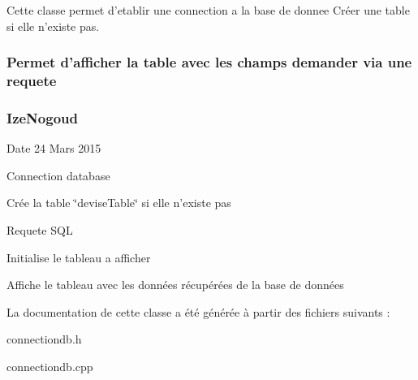 Cette classe permet d'etablir une connection a la base de donnee Créer une table si elle n'existe pas. \subsubsection*{Permet d'afficher la table avec les champs demander via une requete }



 

\subsubsection*{Ize\-Nogoud }

\begin{DoxyDate}{Date}
24 Mars 2015 
\end{DoxyDate}
Connection database

Crée la table \char`\"{}devise\-Table\char`\"{} si elle n'existe pas

Requete S\-Q\-L

Initialise le tableau a afficher

Affiche le tableau avec les données récupérées de la base de données 

La documentation de cette classe a été générée à partir des fichiers suivants \-:\begin{DoxyCompactItemize}
\item 
connectiondb.\-h\item 
connectiondb.\-cpp\end{DoxyCompactItemize}
